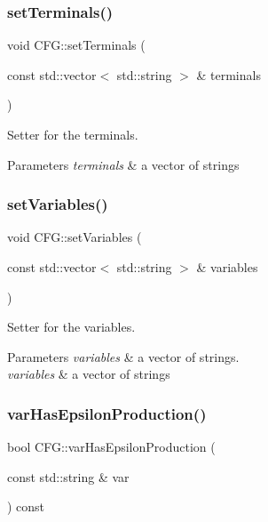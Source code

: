 \subsubsection{\texorpdfstring{set\+Terminals()}{setTerminals()}}
{\footnotesize\ttfamily void C\+F\+G\+::set\+Terminals (\begin{DoxyParamCaption}\item[{const std\+::vector$<$ std\+::string $>$ \&}]{terminals }\end{DoxyParamCaption})}



Setter for the terminals. 


\begin{DoxyParams}{Parameters}
{\em terminals} & a vector of strings \\
\hline
\end{DoxyParams}
\mbox{\label{classCFG_a5cbdb89aa2f3721e651a177e730fa850}} 
\subsubsection{\texorpdfstring{set\+Variables()}{setVariables()}}
{\footnotesize\ttfamily void C\+F\+G\+::set\+Variables (\begin{DoxyParamCaption}\item[{const std\+::vector$<$ std\+::string $>$ \&}]{variables }\end{DoxyParamCaption})}



Setter for the variables. 


\begin{DoxyParams}{Parameters}
{\em variables} & a vector of strings.\\
\hline
{\em variables} & a vector of strings \\
\hline
\end{DoxyParams}
\mbox{\label{classCFG_aa9e56706a12d26ca22295e6b4f82688a}} 
\subsubsection{\texorpdfstring{var\+Has\+Epsilon\+Production()}{varHasEpsilonProduction()}}
{\footnotesize\ttfamily bool C\+F\+G\+::var\+Has\+Epsilon\+Production (\begin{DoxyParamCaption}\item[{const std\+::string \&}]{var }\end{DoxyParamCaption}) const}



